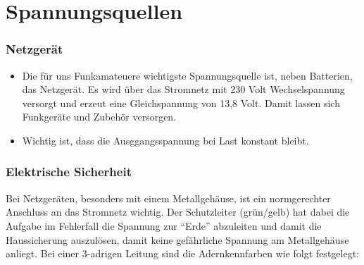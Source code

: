 
\section{Spannungsquellen}
\label{section:spannungsquelle}
\begin{frame}%

\frametitle{Netzgerät}
\begin{itemize}
  \item Die für uns Funkamateuere wichtigste Spannungsquelle ist, neben Batterien, das Netzgerät. Es wird über das Stromnetz mit 230 Volt Wechselspannung versorgt und erzeut eine Gleichspannung von 13,8 Volt. Damit lassen sich Funkgeräte und Zubehör versorgen.
  \item Wichtig ist, dass die Ausggangsspannung bei Last konstant bleibt.
  \end{itemize}
\end{frame}

\begin{frame}
\end{frame}

\begin{frame}
\frametitle{Elektrische Sicherheit}
Bei Netzgeräten, besonders mit einem Metallgehäuse, ist ein normgerechter Anschluss an das Stromnetz wichtig. Der Schutzleiter (grün/gelb) hat dabei die Aufgabe im Fehlerfall die Spannung zur \enquote{Erde} abzuleiten und damit die Haussicherung auszulösen, damit keine gefährliche Spannung am Metallgehäuse anliegt. Bei einer 3-adrigen Leitung sind die Adernkennfarben wie folgt festgelegt:

\end{frame}

